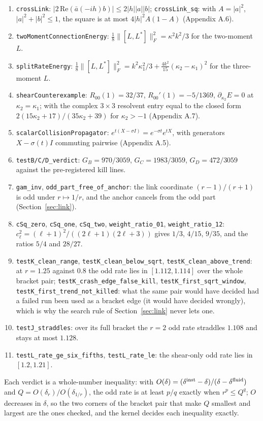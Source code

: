 \documentclass[11pt]{article}
\begin{document}
\begin{enumerate}
\item \texttt{crossLink}: $|2\,\mathrm{Re}(\bar a(-ih)b)|\le2|h||a||b|$; \texttt{crossLink\_sq}: with $A=|a|^2$, $|a|^2+|b|^2\le1$, the square is at most $4|h|^2A(1-A)$ (Appendix A.6).
\item \texttt{twoMomentConnectionEnergy}: $\tfrac18\lVert[L,L^\ast]\rVert_F^2=\kappa^2k^2/3$ for the two-moment $L$.
\item \texttt{splitRateEnergy}: $\tfrac18\lVert[L,L^\ast]\rVert_F^2=k^2\kappa_1^2/3+\tfrac{4k^2}{15}(\kappa_2-\kappa_1)^2$ for the three-moment $L$.
\item \texttt{shearCounterexample}: $R_{00}(1)=32/37$, $R_{00}'(1)=-5/1369$, $\partial_{\kappa_2}E=0$ at $\kappa_2=\kappa_1$; with the complex $3\times3$ resolvent entry equal to the closed form $2(15\kappa_2+17)/(35\kappa_2+39)$ for $\kappa_2>-1$ (Appendix A.7).
\item \texttt{scalarCollisionPropagator}: $e^{t(X-\sigma I)}=e^{-\sigma t}e^{tX}$, with generators $X-\sigma(t)I$ commuting pairwise (Appendix A.5).
\item \texttt{testB/C/D\_verdict}: $G_B=970/3059$, $G_C=1983/3059$, $G_D=472/3059$ against the pre-registered kill lines.
\item \texttt{gam\_inv}, \texttt{odd\_part\_free\_of\_anchor}: the link coordinate $(r-1)/(r+1)$ is odd under $r\mapsto1/r$, and the anchor cancels from the odd part (Section~\ref{sec:link}).
\item \texttt{cSq\_zero}, \texttt{cSq\_one}, \texttt{cSq\_two}, \texttt{weight\_ratio\_01}, \texttt{weight\_ratio\_12}: $c_\ell^2=(\ell+1)^2/((2\ell+1)(2\ell+3))$ gives $1/3$, $4/15$, $9/35$, and the ratios $5/4$ and $28/27$.
\item \texttt{testK\_clean\_range}, \texttt{testK\_clean\_below\_sqrt}, \texttt{testK\_clean\_above\_trend}: at $r=1.25$ against $0.8$ the odd rate lies in $[1.112,1.114]$ over the whole bracket pair; \texttt{testK\_crash\_edge\_false\_kill}, \texttt{testK\_first\_sqrt\_window}, \texttt{testK\_first\_trend\_not\_killed}: what the same pair would have decided had a failed run been used as a bracket edge (it would have decided wrongly), which is why the search rule of Section~\ref{sec:link} never lets one.
\item \texttt{testJ\_straddles}: over its full bracket the $r=2$ odd rate straddles $1.108$ and stays at most $1.128$.
\item \texttt{testL\_rate\_ge\_six\_fifths}, \texttt{testL\_rate\_le}: the shear-only odd rate lies in $[1.2,1.21]$.
\end{enumerate}
Each verdict is a whole-number inequality: with $O(\delta)=(\delta^{\rm inst}-\delta)/(\delta-\delta^{\rm fluid})$ and $Q=O(\delta_r)/O(\delta_{1/r})$, the odd rate is at least $p/q$ exactly when $r^p\le Q^q$; $O$ decreases in $\delta$, so the two corners of the bracket pair that make $Q$ smallest and largest are the ones checked, and the kernel decides each inequality exactly.
\end{document}
